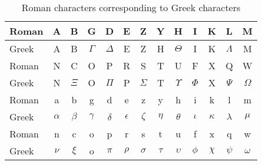 \begin{table}
   \centering
   \begin{tabular}{|l|*{12}{c|}}
   \hline
   Roman&A&B&G&D&E&Z&Y&H&I&K&L&M\\
   \hline
   Greek&A & B & $\Gamma$ & $\Delta$ & E & Z & H & $\Theta$ & I & K &
   $\Lambda$ & M \\
   \hline\hline
   Roman&N&C&O&P&R&S&T&U&F&X&Q&W\\
   \hline
   Greek&N & $\Xi$ & O & $\Pi$ & P & $\Sigma$ &
   T & $\Upsilon$ & $\Phi$ & X & $\Psi$ & $\Omega$ \\
   \hline\hline
   Roman&a&b&g&d&e&z&y&h&i&k&l&m\\
   \hline
   Greek&   $\alpha$ & $\beta$ & $\gamma$ & $\delta$ & $\epsilon$ & $\zeta$ &
   $\eta$ & $\theta$ & $\iota$ & $\kappa$ &
   $\lambda$ & $\mu$ \\
   \hline\hline
   Roman&n&c&o&p&r&s&t&u&f&x&q&w\\
   \hline
   Greek& $\nu$ & $\xi$ & o & $\pi$ & $\rho$ & $\sigma$ &
   $\tau$ & $\upsilon$ & $\phi$ & $\chi$ & $\psi$ & $\omega$ \\
   \hline
   \end{tabular}
\caption{Roman characters corresponding to Greek characters}
\label{greek}
\end{table}

